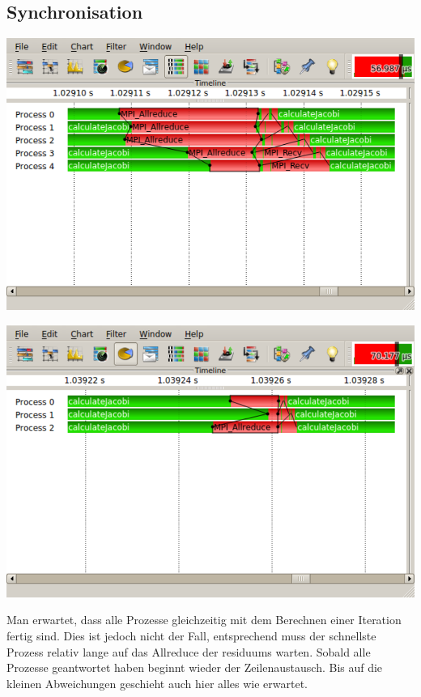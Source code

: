 \documentclass[a4paper]{article}
\begin{document}
\subsection{Synchronisation}
\includegraphics[scale=0.9]{img/ja_5_4_synchro.png}

\includegraphics[scale=0.9]{img/ja_3_2_synchro.png}

Man erwartet, dass alle Prozesse gleichzeitig mit dem Berechnen einer Iteration fertig sind. Dies ist jedoch nicht der Fall, entsprechend muss der schnellste Prozess relativ lange auf das Allreduce der residuums warten. Sobald alle Prozesse geantwortet haben beginnt wieder der Zeilenaustausch. Bis auf die kleinen Abweichungen geschieht auch hier alles wie erwartet.
\end{document}
